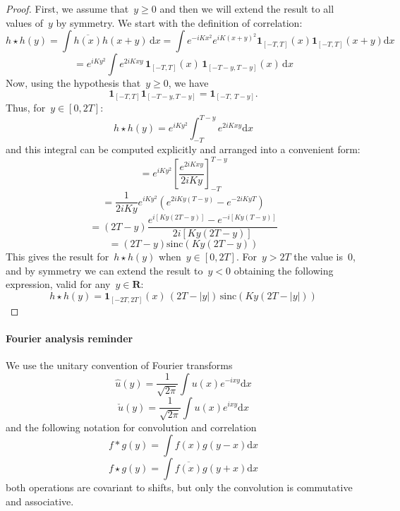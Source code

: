 \documentclass[a4paper]{article}           %
\newcommand{\1}{\mathbf{1}}
\newcommand{\R}{\mathbf{R}}
\newcommand{\ud}{\mathrm{d}}
\newcommand{\abs}[1]{\left|#1\right|}
\newcommand{\paren}[1]{\left(#1\right)}
\begin{document}
\begin{proof}
	First, we assume that~$y\ge0$ and then we will extend the result to all
	values of~$y$ by symmetry.  We start with the definition of correlation:
	\[
		h\star h (y)
		=
		\int
		\overline{h(x)}h(x+y)\,\ud x
		=
		\int
		e^{-iKx^2}
		e^{iK\paren{x+y}^2}
		\1_{[-T,T]} (x)
		\1_{[-T,T]} (x+y)
		\ud x
	\]
	\[
		=
		e^{iKy^2}
		\int
		e^{2iKxy}
		\,
		\1_{[-T,T]} (x)
		\,
		\1_{[-T-y,T-y]} (x)
		\,
		\ud x
	\]
	Now, using the hypothesis that~$y\ge0$, we have
	\[
		\1_{[-T,T]} \1_{[-T-y,T-y]}
		=
		\1_{[-T,\ T-y]}.
	\]
	Thus, for~$y\in[0,2T]$:
	\[
		h\star h (y)
		=
		e^{iKy^2}
		\int_{-T}^{T-y}
		e^{2iKxy}
		\ud x
	\]
	and this integral can be computed explicitly and arranged into a convenient
	form:
	\[
		=
		e^{iKy^2}
		\left[
			\frac{\displaystyle e^{2iKxy}}{2iKy}
		\right]_{-T}^{T-y}
	\]
	\[
		=
		\frac{1}{2iKy}
		e^{iKy^2}
		\paren{
			e^{2iKy(T-y)}
			-
			e^{-2iKyT}
		}
	\]
	\[
		=
		\paren{2T-y}
		\frac{
			e^{i\left[Ky\paren{2T-y}\right]}-e^{-i\left[Ky\paren{T-y}\right]}
			}{
				2i\left[Ky\paren{2T-y}\right]
		}
	\]
	\[
		=
		\paren{2T-y}\mathrm{sinc}\paren{Ky\paren{2T-y}}
	\]
	This gives the result for~$h\star h(y)$ when~$y\in[0,2T]$.  For~$y>2T$ the
	value is~$0$, and by symmetry we can extend the result to~$y<0$ obtaining
	the following expression, valid for any~$y\in\R$:
	\[
		h\star h(y)=\1_{[-2T,2T]}(x)\,\paren{2T-\abs{y}}
		\,
		\mathrm{sinc}\paren{ Ky\paren{2T-\abs{y}} }
	\]
\end{proof}



\clearpage
\paragraph{Fourier analysis reminder}

We use the unitary convention of Fourier transforms
$$ \hat{u}(y)=\frac{1}{\sqrt{2\pi}}\int u(x)e^{-ixy}\ud x $$
$$ \check{u}(y)=\frac{1}{\sqrt{2\pi}}\int u(x)e^{ixy}\ud x $$
and the following notation for convolution and correlation
$$ f*g(y)=\int f(x)g(y-x)\ud x $$
$$ f\star g(y)=\int \overline{f(x)}g(y+x)\ud x $$
both operations are covariant to shifts, but only the
convolution is commutative and associative.
\end{document}
